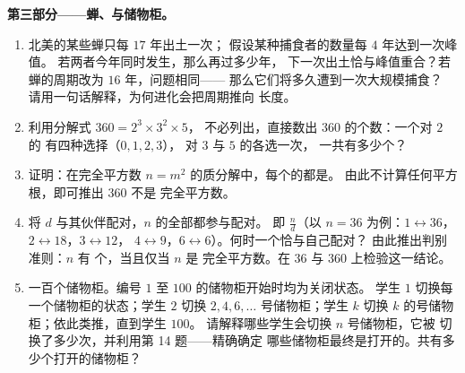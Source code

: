 \begin{problem}
\medskip
\noindent\textbf{第三部分——蝉、与储物柜。}
\begin{enumerate}[resume]
  \item 北美的某些蝉只每 $17$ 年出土一次；
        假设某种捕食者的数量每 $4$ 年达到一次峰值。
        若两者今年同时发生，那么再过多少年，
        下一次出土恰与峰值重合？若蝉的周期改为 $16$ 年，问题相同——
        那么它们将多久遭到一次大规模捕食？
        请用一句话解释，为何进化会把周期推向
        \emph{}长度。
  \item 利用分解式 $360 = 2^3 \times 3^2 \times 5$，
        不必列出，直接数出 $360$ 的个数：一个对 $2$ 的
        有四种选择（$0, 1, 2, 3$），
        对 $3$ 与 $5$ 的各选一次，
        一共有多少个？
  \item 证明：在完全平方数
        $n = m^2$ 的质分解中，每个的都是\emph{}。
        由此不计算任何平方根，即可推出 $360$ 不是
        完全平方数。
  \item 将 $d$ 与其伙伴配对，$n$ 的全部都参与配对。
        即 $\frac{n}{d}$（以 $n = 36$ 为例：$1 \leftrightarrow 36$，
        $2 \leftrightarrow 18$，$3 \leftrightarrow 12$，
        $4 \leftrightarrow 9$，$6 \leftrightarrow 6$）。何时一个恰与自己配对？
        由此推出判别准则：$n$ 有
        \emph{}个，当且仅当 $n$ 是
        完全平方数。在 $36$ 与 $360$ 上检验这一结论。
  \item 一百个储物柜。编号 $1$ 至 $100$ 的储物柜开始时均为关闭状态。
        学生 $1$ 切换每一个储物柜的状态；学生 $2$ 切换
        $2, 4, 6, \dots$ 号储物柜；学生 $k$ 切换
        $k$ 的号储物柜；依此类推，直到学生 $100$。
        请解释哪些学生会切换 $n$ 号储物柜，它被
        切换了多少次，并利用第 14 题——精确确定
        哪些储物柜最终是打开的。共有多少个打开的储物柜？
\end{enumerate}
\end{problem}
